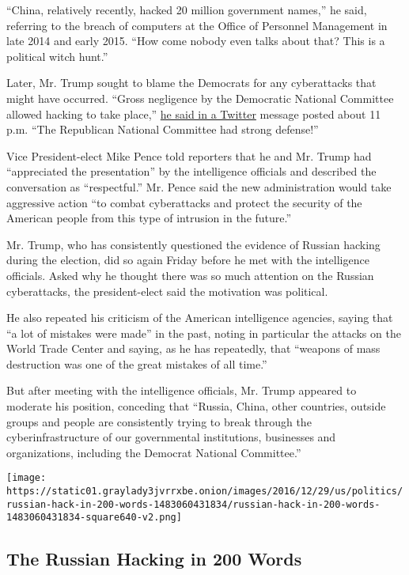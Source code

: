 ``China, relatively recently, hacked 20 million government names,'' he
said, referring to the breach of computers at the Office of Personnel
Management in late 2014 and early 2015. ``How come nobody even talks
about that? This is a political witch hunt.''

Later, Mr. Trump sought to blame the Democrats for any cyberattacks that
might have occurred. ``Gross negligence by the Democratic National
Committee allowed hacking to take place,''
\href{https://twitter.com/realDonaldTrump/status/817579925771341825}{he
said in a Twitter} message posted about 11 p.m. ``The Republican
National Committee had strong defense!''

Vice President-elect Mike Pence told reporters that he and Mr. Trump had
``appreciated the presentation'' by the intelligence officials and
described the conversation as ``respectful.'' Mr. Pence said the new
administration would take aggressive action ``to combat cyberattacks and
protect the security of the American people from this type of intrusion
in the future.''

Mr. Trump, who has consistently questioned the evidence of Russian
hacking during the election, did so again Friday before he met with the
intelligence officials. Asked why he thought there was so much attention
on the Russian cyberattacks, the president-elect said the motivation was
political.

He also repeated his criticism of the American intelligence agencies,
saying that ``a lot of mistakes were made'' in the past, noting in
particular the attacks on the World Trade Center and saying, as he has
repeatedly, that ``weapons of mass destruction was one of the great
mistakes of all time.''

But after meeting with the intelligence officials, Mr. Trump appeared to
moderate his position, conceding that ``Russia, China, other countries,
outside groups and people are consistently trying to break through the
cyberinfrastructure of our governmental institutions, businesses and
organizations, including the Democrat National Committee.''

\href{https://www.nytimes3xbfgragh.onion/interactive/2016/12/29/us/politics/russian-hack-in-200-words.html}{}

\texttt{[image: https://static01.graylady3jvrrxbe.onion/images/2016/12/29/us/politics/russian-hack-in-200-words-1483060431834/russian-hack-in-200-words-1483060431834-square640-v2.png]}

\hypertarget{the-russian-hacking-in-200-words}{%
\subsection{The Russian Hacking in 200
Words}\label{the-russian-hacking-in-200-words}}

